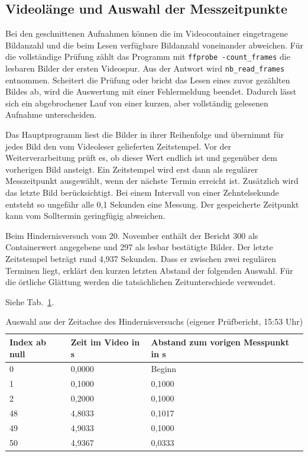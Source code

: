 \subsection{Videolänge und Auswahl der Messzeitpunkte}
Bei den geschnittenen Aufnahmen können die im Videocontainer eingetragene Bildanzahl und die beim Lesen verfügbare Bildanzahl voneinander abweichen. Für die vollständige Prüfung zählt das Programm mit \lstinline|ffprobe -count_frames| die lesbaren Bilder der ersten Videospur. Aus der Antwort wird \lstinline|nb_read_frames| entnommen. Scheitert die Prüfung oder bricht das Lesen eines zuvor gezählten Bildes ab, wird die Auswertung mit einer Fehlermeldung beendet. Dadurch lässt sich ein abgebrochener Lauf von einer kurzen, aber vollständig gelesenen Aufnahme unterscheiden.

Das Hauptprogramm liest die Bilder in ihrer Reihenfolge und übernimmt für jedes Bild den vom Videoleser gelieferten Zeitstempel. Vor der Weiterverarbeitung prüft es, ob dieser Wert endlich ist und gegenüber dem vorherigen Bild ansteigt. Ein Zeitstempel wird erst dann als regulärer Messzeitpunkt ausgewählt, wenn der nächste Termin erreicht ist. Zusätzlich wird das letzte Bild berücksichtigt. Bei einem Intervall von einer Zehntelsekunde entsteht so ungefähr alle 0,1 Sekunden eine Messung. Der gespeicherte Zeitpunkt kann vom Solltermin geringfügig abweichen.

Beim Hindernisversuch vom 20. November enthält der Bericht 300 als Containerwert angegebene und 297 als lesbar bestätigte Bilder. Der letzte Zeitstempel beträgt rund 4,937 Sekunden. Dass er zwischen zwei regulären Terminen liegt, erklärt den kurzen letzten Abstand der folgenden Auswahl. Für die örtliche Glättung werden die tatsächlichen Zeitunterschiede verwendet.

Siehe Tab.~\ref{tab:em-zeit}.
\begin{table}[htbp]\centering\caption{Auswahl aus der Zeitachse des Hindernisversuchs (eigener Prüfbericht, 15:53 Uhr)}\label{tab:em-zeit}
\begin{tabular}{@{}lll@{}}\toprule Index ab null & Zeit im Video in s & Abstand zum vorigen Messpunkt in s\\\midrule
0 & 0,0000 & Beginn\\
1 & 0,1000 & 0,1000\\
2 & 0,2000 & 0,1000\\
48 & 4,8033 & 0,1017\\
49 & 4,9033 & 0,1000\\
50 & 4,9367 & 0,0333\\\bottomrule\end{tabular}\end{table}

